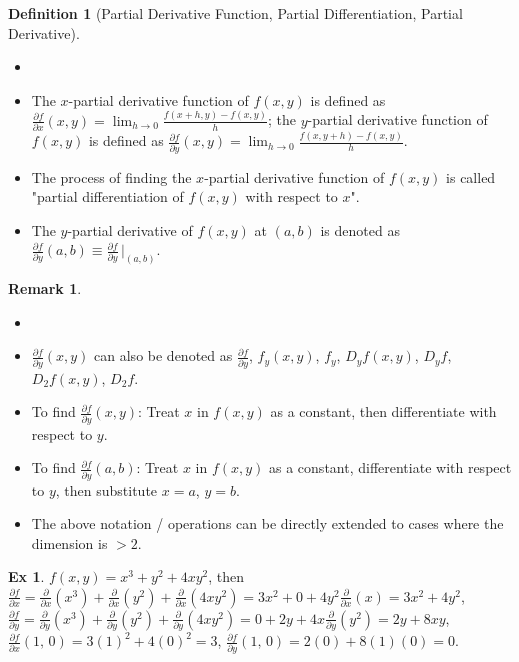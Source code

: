 \documentclass[12pt]{extarticle}
\newcommand{\ds}{\displaystyle}
\theoremstyle{definition}
\newtheorem*{dfn}{Definition}
\newtheorem*{ex}{Ex}
\newtheorem*{rmk}{Remark}
\newcommand{\pdiff}[2]{\frac{\partial #1}{\partial #2}}
\begin{document}
\begin{dfn}[Partial Derivative Function, Partial Differentiation, Partial Derivative]
  \begin{itemize}\setlength{\itemsep}{0pt}
    \item[]
    \item The $x$-partial derivative function of $\ds f(x, y)$ is defined as $\ds\pdiff{f}{x}(x, y) = \lim_{h\to 0}\frac{f(x + h, y) - f(x, y)}{h}$; the $y$-partial derivative function of $\ds f(x, y)$ is defined as $\ds\pdiff{f}{y}(x,y) = \lim_{h\to 0}\frac{f(x, y + h) - f(x, y)}{h}$. 
    \item The process of finding the $x$-partial derivative function of $f(x, y)$ is called "partial differentiation of $\ds f(x, y)$ with respect to $x$". 
    \item The $y$-partial derivative of $\ds f(x, y)$ at $(a, b)$ is denoted as $\ds\pdiff{f}{y}(a,b)\equiv\pdiff{f}{y}\,\bigg|_{(a,b)}$. 
  \end{itemize}
\end{dfn}
\begin{rmk}
  \begin{itemize}\setlength{\itemsep}{0pt}
    \item[]
    \item $\ds\pdiff{f}{y}(x,y)$ can also be denoted as $\ds\pdiff{f}{y}$, $\ds f_y(x,y)$, $\ds f_y$, $\ds D_yf(x,y)$, $\ds D_yf$, $D_2 f(x,y)$, $D_2 f$. 
    \item To find $\ds\pdiff{f}{y}(x, y)$: Treat $x$ in $f(x, y)$ as a constant, then differentiate with respect to $y$. 
    \item To find $\ds\pdiff{f}{y}(a, b)$: Treat $x$ in $f(x, y)$ as a constant, differentiate with respect to $y$, then substitute $x = a$, $y = b$. 
    \item The above notation / operations can be directly extended to cases where the dimension is $> 2$. 
  \end{itemize}
\end{rmk}

\begin{ex}
  $\ds f(x,y) = x^3 + y^2 + 4xy^2$, then $\ds\pdiff{f}{x} = \pdiff{}{x}(x^3) + \pdiff{}{x}(y^2) + \pdiff{}{x}(4xy^2) = 3x^2 + 0 + 4y^2\pdiff{}{x}(x) = 3x^2 + 4y^2$, $\ds\pdiff{f}{y} = \pdiff{}{y}(x^3) + \pdiff{}{y}(y^2) +\pdiff{}{y}(4xy^2) = 0 + 2y + 4x\pdiff{}{y}(y^2) = 2y + 8xy$, $\ds\pdiff{f}{x}(1,\,0) = 3(1)^2 + 4(0)^2 = 3$, $\ds\pdiff{f}{y}(1,\,0) = 2(0) + 8(1)(0) = 0$. 
\end{ex}
\end{document}
